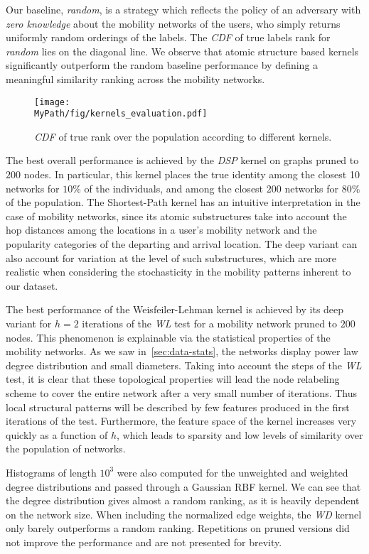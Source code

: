 Our baseline, \emph{random}, is a strategy which reflects the policy of an adversary with \emph{zero knowledge} about the mobility networks of the users, who simply returns uniformly random orderings of the labels.
The \emph{CDF} of true labels rank for \emph{random}  lies on the diagonal line.
We observe that atomic structure based kernels significantly outperform the random baseline performance by defining a meaningful similarity ranking across the mobility networks.

\begin{figure}[!t]
	\centering
	\texttt{[image: \\MyPath/fig/kernels\_evaluation.pdf]}
	\caption{\emph{CDF} of true rank over the population according to different kernels.}
	\label{fig:kernels_evaluation}
\end{figure}

The best overall performance is achieved by the \emph{DSP} kernel on graphs pruned to $ 200 $ nodes.
In particular, this kernel places the true identity among the closest 10 networks for $10\%$ of the individuals, and among the closest $ 200 $ networks for $ 80\%$ of the population.
The Shortest-Path kernel has an intuitive interpretation in the case of mobility networks, since its atomic substructures take into account the hop distances among the locations in a user's mobility network and the popularity categories of the departing and arrival location.
The deep variant can also account for variation at the level of such substructures, which are more realistic when considering the stochasticity in the mobility patterns inherent to our dataset.

The best performance of the Weisfeiler-Lehman kernel is achieved by its deep variant for $ h=2 $ iterations of the \emph{WL} test for a mobility network pruned to $200$ nodes.
This phenomenon is explainable via the statistical properties of the mobility networks.
As we saw in~\cref{sec:data-stats}, the networks display power law degree distribution and small diameters.
Taking into account the steps of the \emph{WL} test, it is clear that these topological properties will lead the node relabeling scheme to cover the entire network after a very small number of iterations.
Thus local structural patterns will be described by few features produced in the first iterations of the test.
Furthermore, the feature space of the kernel increases very quickly as a function of $ h $, which leads to sparsity and low levels of similarity over the population of networks.

Histograms of length $10^3$ were also computed for the unweighted and weighted degree distributions and passed through a Gaussian RBF kernel.
We can see that the degree distribution gives almost a random ranking, as it is heavily dependent on the network size.
When including the normalized edge weights, the \emph{WD} kernel only barely outperforms a random ranking.
Repetitions on pruned versions did not improve the performance and are not presented for brevity.

